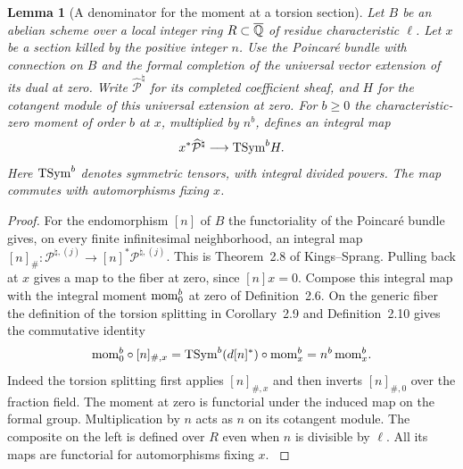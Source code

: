 \documentclass[a4paper,11pt]{article}
\newtheorem{lemma}[proposition]{Lemma}
\theoremstyle{definition}
\theoremstyle{remark}
\numberwithin{equation}{section}
\begin{document}
\begin{lemma}[A denominator for the moment at a torsion section]
\leavevmode\label{lem:nonetalemoment733}
Let \(B\) be an abelian scheme over a local integer ring
\(R\subset\overline{\mathbb Q}\) of residue characteristic \(\ell\).
Let \(x\) be a section killed by the positive integer \(n\).
Use the Poincaré bundle with connection on \(B\) and the formal
completion of the universal vector extension of its dual at zero.
Write \(\widehat{\mathcal P}^{\natural}\) for its completed
coefficient sheaf, and \(H\) for the cotangent module of this
universal extension at zero. For \(b\ge0\) the characteristic-zero
moment of order \(b\) at \(x\), multiplied by \(n^b\), defines an
integral map
\[
     x^*\widehat{\mathcal P}^{\natural}
              \longrightarrow {\rm TSym}^{b}H.
\]
Here \({\rm TSym}^b\) denotes symmetric tensors, with integral
divided powers. The map commutes with automorphisms fixing \(x\).
\end{lemma}
\begin{proof}
For the endomorphism \([n]\) of \(B\) the functoriality of the
Poincaré bundle gives, on every finite infinitesimal neighborhood,
an integral map \([n]_\#:\mathcal P^{\natural,(j)}
\to[n]^*\mathcal P^{\natural,(j)}\). This is Theorem~2.8 of
Kings--Sprang. Pulling back at \(x\) gives a map to the fiber at
zero, since \([n]x=0\). Compose this integral map with the integral
moment \({\rm mom}^b_0\) at zero of Definition~2.6. On the generic
fiber the definition of the torsion splitting in Corollary~2.9
and Definition~2.10 gives the commutative identity
\[
   {\rm mom}^b_0\circ[n]_{\#,x}
        ={\rm TSym}^b(d[n]^*)\circ{\rm mom}^b_x
        = n^b\,{\rm mom}^b_x .
\]
Indeed the torsion splitting first applies \([n]_{\#,x}\) and
then inverts \([n]_{\#,0}\) over the fraction field. The moment
at zero is functorial under the induced map on the formal group.
Multiplication by \(n\) acts as \(n\) on its cotangent module.
The composite on the left is defined over \(R\) even when \(n\)
is divisible by \(\ell\). All its maps are functorial for
automorphisms fixing \(x\). \cite{II-II-kingssprang731}
\end{proof}
\end{document}
